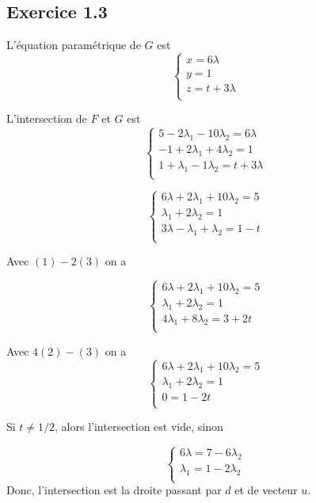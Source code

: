 \documentclass[]{book}
\theoremstyle{definition}
\begin{document}
\subsection*{Exercice 1.3}
L'\'equation param\'etrique de $G$ est 
$$
\left\{
\begin{array}{l}
x = 6 \lambda\\
y = 1\\
z = t + 3\lambda\\
\end{array}
\right.
$$

L'intersection de $F$ et $G$ est
$$
\left\{
\begin{array}{l}
 5 -2\lambda_1 - 10\lambda_2 = 6 \lambda\\
 -1 +2\lambda_1 + 4\lambda_2 = 1\\
 1 +\lambda_1 - 1\lambda_2 = t + 3 \lambda\\
\end{array}
\right.
$$

$$
\left\{
\begin{array}{l}
 6 \lambda + 2\lambda_1 + 10\lambda_2 = 5\\
 \lambda_1 + 2\lambda_2 = 1\\
 3 \lambda - \lambda_1 + \lambda_2 = 1 - t \\
\end{array}
\right.
$$

Avec $(1)-2(3)$ on a

$$
\left\{
\begin{array}{l}
 6 \lambda + 2\lambda_1 + 10\lambda_2 = 5\\
 \lambda_1 + 2\lambda_2 = 1\\
 4 \lambda_1 + 8 \lambda_2 = 3 + 2t \\
\end{array}
\right.
$$

Avec $4(2) - (3)$ on a 
$$
\left\{
\begin{array}{l}
 6 \lambda + 2\lambda_1 + 10\lambda_2 = 5\\
 \lambda_1 + 2\lambda_2 = 1\\
 0 = 1 - 2t \\
\end{array}
\right.
$$

Si $t \neq 1/2$, alors l'intersection est vide, sinon 

$$
\left\{
\begin{array}{l}
 6 \lambda  = 7 - 6\lambda_2\\
 \lambda_1  = 1 - 2\lambda_2\\
\end{array}
\right.
$$
Donc, l'intersection est la droite passant par $d$ et de vecteur $u$. 
\end{document}
